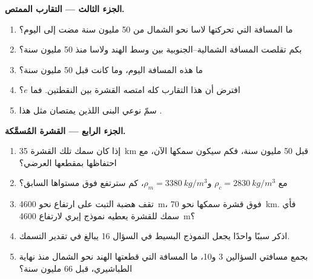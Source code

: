 \begin{problem}
\medskip
\noindent\textbf{الجزء الثالث --- التقارب الممتص.}
\begin{enumerate}[resume]
  \item ما المسافة التي تحركتها لاسا نحو الشمال من 50 مليون سنة مضت إلى اليوم؟
  \item بكم تقلصت المسافة الشمالية--الجنوبية بين وسط الهند
        ولاسا منذ 50 مليون سنة؟
  \item ما هذه المسافة اليوم، وما كانت قبل 50 مليون سنة؟
  \item افترض أن هذا التقارب كله امتصه 
        القشرة بين النقطتين. فما  $e$؟
  \item سمّ نوعي البنى اللذين يمتصان مثل هذا .
\end{enumerate}

\medskip
\noindent\textbf{الجزء الرابع --- القشرة المُسمَّكة.}
\begin{enumerate}[resume]
  \item إذا كان سمك تلك القشرة \qty{35}{km} قبل 50 مليون سنة، فكم
        سيكون سمكها الآن، مع احتفاظها بمقطعها العرضي؟
  \item مع $\rho_c = \qty{2830}{kg/m^3}$ و$\rho_m = \qty{3380}{kg/m^3}$،
        كم سترتفع فوق مستواها السابق؟
  \item تقف هضبة التبت على ارتفاع نحو \qty{4600}{m}، فوق قشرة
        سمكها نحو \qty{70}{km}. فأي سمك للقشرة يعطيه نموذج إيري
        لارتفاع \qty{4600}{m}؟
  \item اذكر سببًا واحدًا يجعل النموذج البسيط في السؤال 16 يبالغ في تقدير
        التسمك.
  \item بجمع مسافتي السؤالين 3 و10، ما المسافة التي قطعتها الهند
        نحو الشمال منذ نهاية الطباشيري، قبل 66 مليون
        سنة؟
\end{enumerate}
\end{problem}
